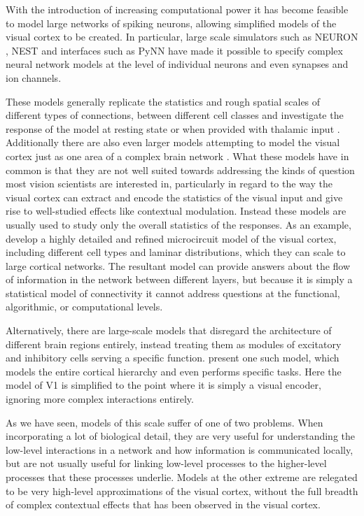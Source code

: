 With the introduction of increasing computational power it has become
feasible to model large networks of spiking neurons, allowing
simplified models of the visual cortex to be created. In particular,
large scale simulators such as NEURON \citep{Hines1994}, NEST
\citep{Gewaltig2007} and interfaces such as PyNN \citep{Davison2009}
have made it possible to specify complex neural network models at the
level of individual neurons and even synapses and ion channels.

These models generally replicate the statistics and rough spatial
scales of different types of connections, between different cell
classes and investigate the response of the model at resting state or
when provided with thalamic input \citep{Shelley2002,
  Potjans2014}. Additionally there are also even larger models
attempting to model the visual cortex just as one area of a complex
brain network \citep{Eliasmith2012}. What these models have in common
is that they are not well suited towards addressing the kinds of
question most vision scientists are interested in, particularly in
regard to the way the visual cortex can extract and encode the
statistics of the visual input and give rise to well-studied effects
like contextual modulation. Instead these models are usually used to
study only the overall statistics of the responses. As an example,
\cite{Potjans2014} develop a highly detailed and refined microcircuit
model of the visual cortex, including different cell types and laminar
distributions, which they can scale to large cortical networks. The
resultant model can provide answers about the flow of information in
the network between different layers, but because it is simply a
statistical model of connectivity it cannot address questions at the
functional, algorithmic, or computational levels.

Alternatively, there are large-scale models that disregard the
architecture of different brain regions entirely, instead treating
them as modules of excitatory and inhibitory cells serving
a specific function. \cite{Eliasmith2012} present one such model,
which models the entire cortical hierarchy and even performs specific
tasks. Here the model of V1 is simplified to the point where it is
simply a visual encoder, ignoring more complex interactions entirely.

As we have seen, models of this scale suffer of one of two
problems. When incorporating a lot of biological detail, they are very
useful for understanding the low-level interactions in a network and
how information is communicated locally, but are not usually useful
for linking low-level processes to the higher-level processes that
these processes underlie. Models at the other extreme are relegated to
be very high-level approximations of the visual cortex, without the
full breadth of complex contextual effects that has been observed in
the visual cortex.

